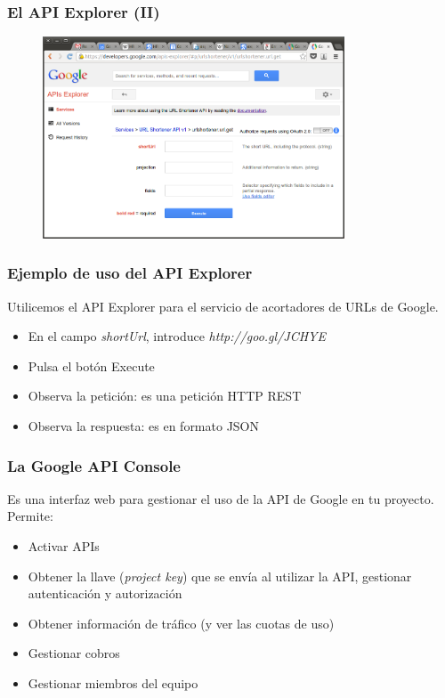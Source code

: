 \begin{frame}
\frametitle{El API Explorer (II)}

\begin{center}
\begin{figure}[p]
\includegraphics[width=0.8\textwidth]{figs/apiexplorer.png}
\end{figure}
\end{center}

\end{frame}


\begin{frame}
\frametitle{Ejemplo de uso del API Explorer}

Utilicemos el API Explorer para el servicio de acortadores de URLs de Google.

\begin{itemize}
  \item En el campo \emph{shortUrl}, introduce \emph{http://goo.gl/JCHYE}
  \item Pulsa el botón Execute
  \item Observa la petición: es una petición HTTP REST
  \item Observa la respuesta: es en formato JSON
\end{itemize}

\end{frame}


\begin{frame}
\frametitle{La Google API Console}

Es una interfaz web para gestionar el uso de la API de Google en tu proyecto.
Permite:

\begin{itemize}
  \item Activar APIs
  \item Obtener la llave (\emph{project key}) que se envía al utilizar la API, gestionar autenticación y autorización
  \item Obtener información de tráfico (y ver las cuotas de uso)
  \item Gestionar cobros
  \item Gestionar miembros del equipo
\end{itemize}

\end{frame}


